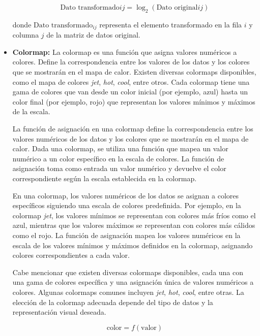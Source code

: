 \documentclass{article}
\begin{document}
\begin{itemize}
\begin{equation}
\textrm{Dato transformado}{ij} = \log_2(\textrm{Dato original}{ij})
\end{equation}

donde $\textrm{Dato transformado}_{ij}$ representa el elemento transformado en la fila $i$ y columna $j$ de la matriz de datos original.

\item\textbf{Colormap: } La colormap es una función que asigna valores numéricos a colores. Define la correspondencia entre los valores de los datos y los colores que se mostrarán en el mapa de calor. Existen diversas colormaps disponibles, como el mapa de colores \textit{jet}, \textit{hot}, \textit{cool}, entre otros. Cada colormap tiene una gama de colores que van desde un color inicial (por ejemplo, azul) hasta un color final (por ejemplo, rojo) que representan los valores mínimos y máximos de la escala.


La función de asignación en una colormap define la correspondencia entre los valores numéricos de los datos y los colores que se mostrarán en el mapa de calor.  Dada una colormap, se utiliza una función que mapea un valor numérico a un color específico en la escala de colores. La función de asignación toma como entrada un valor numérico y devuelve el color correspondiente según la escala establecida en la colormap. 

En una colormap, los valores numéricos de los datos se asignan a colores específicos siguiendo una escala de colores predefinida. Por ejemplo, en la colormap \textit{jet}, los valores mínimos se representan con colores más fríos como el azul, mientras que los valores máximos se representan con colores más cálidos como el rojo. La función de asignación mapea los valores numéricos en la escala de los valores mínimos y máximos definidos en la colormap, asignando colores correspondientes a cada valor.

Cabe mencionar que existen diversas colormaps disponibles, cada una con una gama de colores específica y una asignación única de valores numéricos a colores. Algunas colormaps comunes incluyen \textit{jet}, \textit{hot}, \textit{cool}, entre otras. La elección de la colormap adecuada depende del tipo de datos y la representación visual deseada.

\begin{equation}
\textrm{{color}} = f(\textrm{{valor}})
\end{equation}


\end{itemize}
\end{document}

